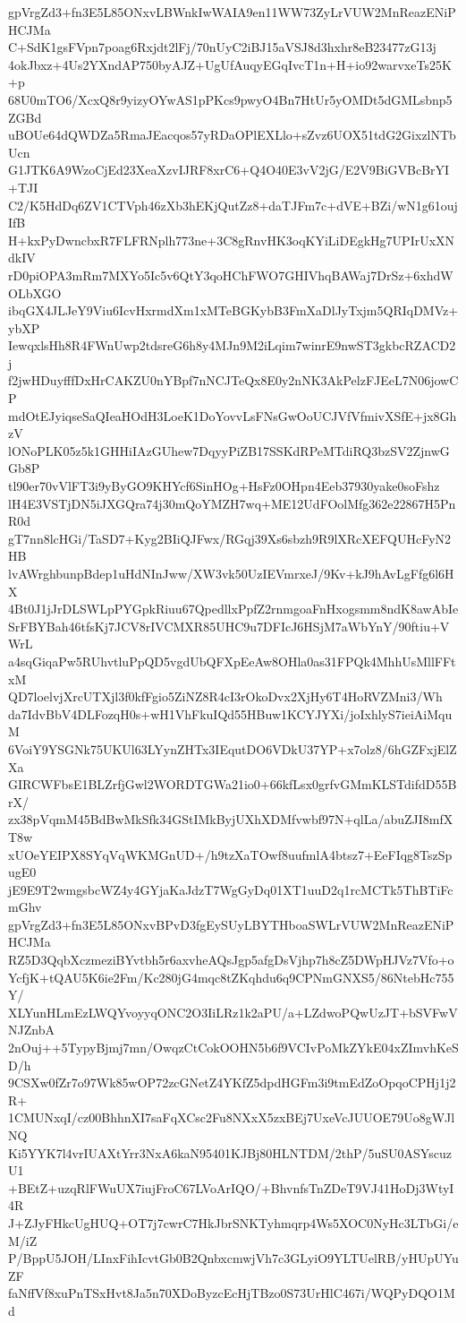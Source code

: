 gpVrgZd3+fn3E5L85ONxvLBWnkIwWAIA9en11WW73ZyLrVUW2MnReazENiPHCJMa
C+SdK1gsFVpn7poag6Rxjdt2lFj/70nUyC2iBJ15aVSJ8d3hxhr8eB23477zG13j
4okJbxz+4Us2YXndAP750byAJZ+UgUfAuqyEGqIvcT1n+H+io92warvxeTs25K+p
68U0mTO6/XcxQ8r9yizyOYwAS1pPKcs9pwyO4Bn7HtUr5yOMDt5dGMLsbnp5ZGBd
uBOUe64dQWDZa5RmaJEacqos57yRDaOPlEXLlo+sZvz6UOX51tdG2GixzlNTbUcn
G1JTK6A9WzoCjEd23XeaXzvIJRF8xrC6+Q4O40E3vV2jG/E2V9BiGVBcBrYI+TJI
C2/K5HdDq6ZV1CTVph46zXb3hEKjQutZz8+daTJFm7c+dVE+BZi/wN1g61oujIfB
H+kxPyDwncbxR7FLFRNplh773ne+3C8gRnvHK3oqKYiLiDEgkHg7UPIrUxXNdkIV
rD0piOPA3mRm7MXYo5Ic5v6QtY3qoHChFWO7GHIVhqBAWaj7DrSz+6xhdWOLbXGO
ibqGX4JLJeY9Viu6IcvHxrmdXm1xMTeBGKybB3FmXaDlJyTxjm5QRIqDMVz+ybXP
IewqxlsHh8R4FWnUwp2tdsreG6h8y4MJn9M2iLqim7winrE9nwST3gkbcRZACD2j
f2jwHDuyfffDxHrCAKZU0nYBpf7nNCJTeQx8E0y2nNK3AkPelzFJEeL7N06jowCP
mdOtEJyiqseSaQIeaHOdH3LoeK1DoYovvLsFNsGwOoUCJVfVfmivXSfE+jx8GhzV
lONoPLK05z5k1GHHiIAzGUhew7DqyyPiZB17SSKdRPeMTdiRQ3bzSV2ZjnwGGb8P
tl90er70vVlFT3i9yByGO9KHYcf6SinHOg+HsFz0OHpn4Eeb37930yake0soFshz
lH4E3VSTjDN5iJXGQra74j30mQoYMZH7wq+ME12UdFOolMfg362e22867H5PnR0d
gT7nn8lcHGi/TaSD7+Kyg2BIiQJFwx/RGqj39Xs6sbzh9R9lXRcXEFQUHcFyN2HB
lvAWrghbunpBdep1uHdNInJww/XW3vk50UzIEVmrxeJ/9Kv+kJ9hAvLgFfg6l6HX
4Bt0J1jJrDLSWLpPYGpkRiuu67QpedllxPpfZ2rnmgoaFnHxogsmm8ndK8awAbIe
SrFBYBah46tfsKj7JCV8rIVCMXR85UHC9u7DFIcJ6HSjM7aWbYnY/90ftiu+VWrL
a4sqGiqaPw5RUhvtluPpQD5vgdUbQFXpEeAw8OHla0as31FPQk4MhhUsMllFFtxM
QD7loelvjXrcUTXjl3f0kfFgio5ZiNZ8R4cI3rOkoDvx2XjHy6T4HoRVZMni3/Wh
da7IdvBbV4DLFozqH0s+wH1VhFkuIQd55HBuw1KCYJYXi/joIxhlyS7ieiAiMquM
6VoiY9YSGNk75UKUl63LYynZHTx3IEqutDO6VDkU37YP+x7olz8/6hGZFxjElZXa
GIRCWFbsE1BLZrfjGwl2WORDTGWa21io0+66kfLsx0grfvGMmKLSTdifdD55BrX/
zx38pVqmM45BdBwMkSfk34GStIMkByjUXhXDMfvwbf97N+qlLa/abuZJI8mfXT8w
xUOeYEIPX8SYqVqWKMGnUD+/h9tzXaTOwf8uufmlA4btsz7+EeFIqg8TszSpugE0
jE9E9T2wmgsbcWZ4y4GYjaKaJdzT7WgGyDq01XT1uuD2q1rcMCTk5ThBTiFcmGhv
gpVrgZd3+fn3E5L85ONxvBPvD3fgEySUyLBYTHboaSWLrVUW2MnReazENiPHCJMa
RZ5D3QqbXczmeziBYvtbh5r6axvheAQsJgp5afgDsVjhp7h8cZ5DWpHJVz7Vfo+o
YcfjK+tQAU5K6ie2Fm/Kc280jG4mqc8tZKqhdu6q9CPNmGNXS5/86NtebHc755Y/
XLYunHLmEzLWQYvoyyqONC2O3IiLRz1k2aPU/a+LZdwoPQwUzJT+bSVFwVNJZnbA
2nOuj++5TypyBjmj7mn/OwqzCtCokOOHN5b6f9VCIvPoMkZYkE04xZImvhKeSD/h
9CSXw0fZr7o97Wk85wOP72zcGNetZ4YKfZ5dpdHGFm3i9tmEdZoOpqoCPHj1j2R+
1CMUNxqI/cz00BhhnXI7saFqXCsc2Fu8NXxX5zxBEj7UxeVcJUUOE79Uo8gWJlNQ
Ki5YYK7l4vrIUAXtYrr3NxA6kaN95401KJBj80HLNTDM/2thP/5uSU0ASYscuzU1
+BEtZ+uzqRlFWuUX7iujFroC67LVoArIQO/+BhvnfsTnZDeT9VJ41HoDj3WtyI4R
J+ZJyFHkcUgHUQ+OT7j7cwrC7HkJbrSNKTyhmqrp4Ws5XOC0NyHc3LTbGi/eM/iZ
P/BppU5JOH/LInxFihIcvtGb0B2QnbxcmwjVh7c3GLyiO9YLTUelRB/yHUpUYuZF
faNffVf8xuPnTSxHvt8Ja5n70XDoByzcEcHjTBzo0S73UrHlC467i/WQPyDQO1Md
